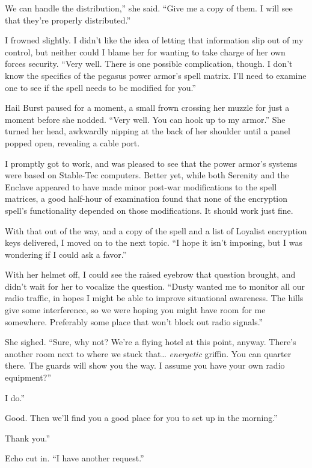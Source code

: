 \leavevmode{}We can handle the distribution,” she said. “Give me a copy of them. I will see that they’re properly distributed.”

I frowned slightly. I didn’t like the idea of letting that information slip out of my control, but neither could I blame her for wanting to take charge of her own forces security. “Very well. There is one possible complication, though. I don’t know the specifics of the pegasus power armor’s spell matrix. I’ll need to examine one to see if the spell needs to be modified for you.”

Hail Burst paused for a moment, a small frown crossing her muzzle for just a moment before she nodded. “Very well. You can hook up to my armor.” She turned her head, awkwardly nipping at the back of her shoulder until a panel popped open, revealing a cable port.

I promptly got to work, and was pleased to see that the power armor’s systems were based on Stable-Tec computers. Better yet, while both Serenity and the Enclave appeared to have made minor post-war modifications to the spell matrices, a good half-hour of examination found that none of the encryption spell’s functionality depended on those modifications. It should work just fine.

With that out of the way, and a copy of the spell and a list of Loyalist encryption keys delivered, I moved on to the next topic. “I hope it isn’t imposing, but I was wondering if I could ask a favor.”

With her helmet off, I could see the raised eyebrow that question brought, and didn’t wait for her to vocalize the question. “Dusty wanted me to monitor all our radio traffic, in hopes I might be able to improve situational awareness. The hills give some interference, so we were hoping you might have room for me somewhere. Preferably some place that won’t block out radio signals.”

She sighed. “Sure, why not? We’re a flying hotel at this point, anyway. There’s another room next to where we stuck that… \textit{energetic} griffin. You can quarter there. The guards will show you the way. I assume you have your own radio equipment?”

\leavevmode{}I do.”

\leavevmode{}Good. Then we’ll find you a good place for you to set up in the morning.”

\leavevmode{}Thank you.”

Echo cut in. “I have another request.”

